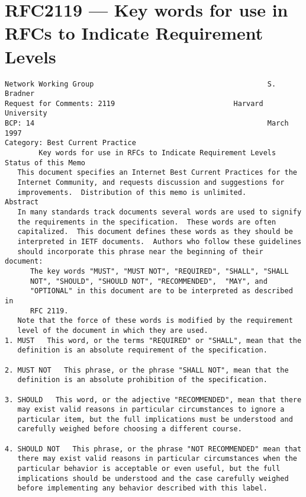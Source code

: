 \chapter{RFC2119 --- Key words for use in RFCs to Indicate Requirement Levels }
\label{app:RFC2119}

\clearpage

\begin{verbatim}
Network Working Group                                         S. Bradner
Request for Comments: 2119                            Harvard University
BCP: 14                                                       March 1997
Category: Best Current Practice
        Key words for use in RFCs to Indicate Requirement Levels
Status of this Memo
   This document specifies an Internet Best Current Practices for the
   Internet Community, and requests discussion and suggestions for
   improvements.  Distribution of this memo is unlimited.
Abstract
   In many standards track documents several words are used to signify
   the requirements in the specification.  These words are often
   capitalized.  This document defines these words as they should be
   interpreted in IETF documents.  Authors who follow these guidelines
   should incorporate this phrase near the beginning of their document:
      The key words "MUST", "MUST NOT", "REQUIRED", "SHALL", "SHALL
      NOT", "SHOULD", "SHOULD NOT", "RECOMMENDED",  "MAY", and
      "OPTIONAL" in this document are to be interpreted as described in
      RFC 2119.
   Note that the force of these words is modified by the requirement
   level of the document in which they are used.
1. MUST   This word, or the terms "REQUIRED" or "SHALL", mean that the
   definition is an absolute requirement of the specification.

2. MUST NOT   This phrase, or the phrase "SHALL NOT", mean that the
   definition is an absolute prohibition of the specification.

3. SHOULD   This word, or the adjective "RECOMMENDED", mean that there
   may exist valid reasons in particular circumstances to ignore a
   particular item, but the full implications must be understood and
   carefully weighed before choosing a different course.

4. SHOULD NOT   This phrase, or the phrase "NOT RECOMMENDED" mean that
   there may exist valid reasons in particular circumstances when the
   particular behavior is acceptable or even useful, but the full
   implications should be understood and the case carefully weighed
   before implementing any behavior described with this label.


\end{verbatim}
